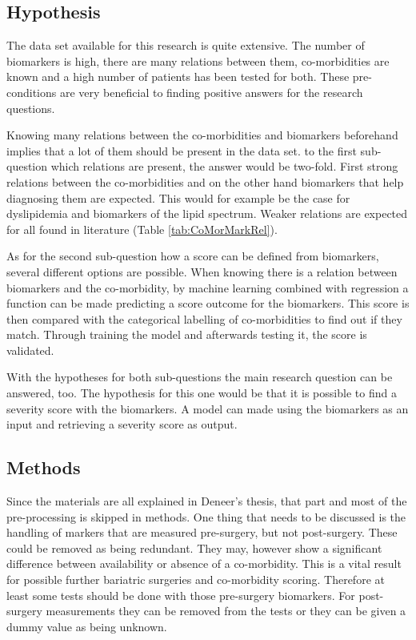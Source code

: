 \documentclass[10pt,a4paper]{article}
\begin{document}
	\subsection{Hypothesis}
	
	The data set available for this research is quite extensive. The number of biomarkers is high, there are many relations between them, co-morbidities are known and a high number of patients has been tested for both. These pre-conditions are very beneficial to finding positive answers for the research questions.
	
	Knowing many relations between the co-morbidities and biomarkers beforehand implies that a lot of them should be present in the data set. to the first sub-question which relations are present, the answer would be two-fold. First strong relations between the co-morbidities and on the other hand biomarkers that help diagnosing them are expected. This would for example be the case for dyslipidemia and biomarkers of the lipid spectrum. Weaker relations are expected for all found in literature (Table \ref{tab:CoMorMarkRel}).
	
	As for the second sub-question how a score can be defined from biomarkers, several different options are possible. When knowing there is a relation between biomarkers and the co-morbidity, by machine learning combined with regression a function can be made predicting a score outcome for the biomarkers. This score is then compared with the categorical labelling of co-morbidities to find out if they match. Through training the model and afterwards testing it, the score is validated. 
	
	With the hypotheses for both sub-questions the main research question can be answered, too. The hypothesis for this one would be that it is possible to find a severity score with the biomarkers. A model can made using the biomarkers as an input and retrieving a severity score as output.
	
	\subsection{Methods}
	
	Since the materials are all explained in Deneer's thesis, that part and most of the pre-processing is skipped in methods. One thing that needs to be discussed is the handling of markers that are measured pre-surgery, but not post-surgery. These could be removed as being redundant. They may, however show a significant difference between availability or absence of a co-morbidity. This is a vital result for possible further bariatric surgeries and co-morbidity scoring. Therefore at least some tests should be done with those pre-surgery biomarkers. For post-surgery measurements they can be removed from the tests or they can be given a dummy value as being unknown.
	
\end{document}
